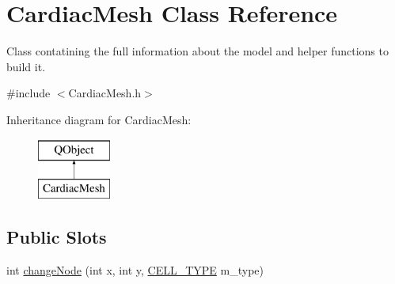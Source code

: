 \hypertarget{class_cardiac_mesh}{\section{Cardiac\+Mesh Class Reference}
\label{class_cardiac_mesh}
}


Class contatining the full information about the model and helper functions to build it.  




{\ttfamily \#include $<$Cardiac\+Mesh.\+h$>$}

Inheritance diagram for Cardiac\+Mesh\+:\begin{figure}[H]
\begin{center}
\leavevmode
\includegraphics[height=2.000000cm]{class_cardiac_mesh}
\end{center}
\end{figure}
\subsection*{Public Slots}
\begin{DoxyCompactItemize}
\item 
int \hyperlink{class_cardiac_mesh_a5131c310815bf636bd6de60e61dc7c5e}{change\+Node} (int x, int y, \hyperlink{heart_defines_8h_a2f059cd81f362503874790462d535f5b}{C\+E\+L\+L\+\_\+\+T\+Y\+P\+E} m\+\_\+type)
\end{DoxyCompactItemize}

